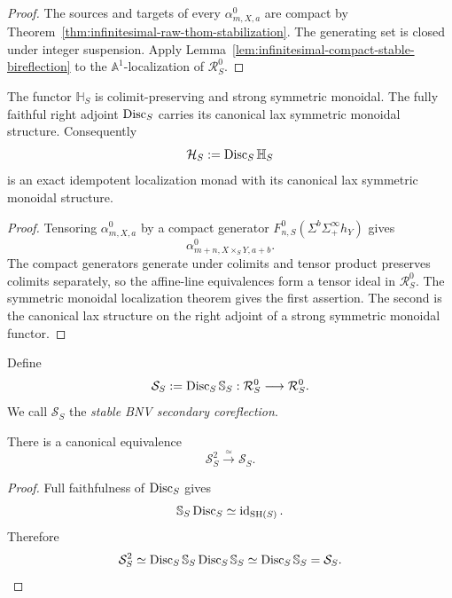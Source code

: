 \begin{proof}
The sources and targets of every \(\alpha^0_{m,X,a}\) are compact by
Theorem~\ref{thm:infinitesimal-raw-thom-stabilization}.  The generating set is
closed under integer suspension.  Apply
Lemma~\ref{lem:infinitesimal-compact-stable-bireflection} to the
\(\mathbb A^1\)-localization of \(\mathcal R_S^0\).
\end{proof}

\begin{proposition}
\label{prop:infinitesimal-bnv-monoidality}
The functor \(\mathbb H_S\) is colimit-preserving and strong symmetric
monoidal.  The fully faithful right adjoint \(\operatorname{Disc}_S\) carries its canonical
lax symmetric monoidal structure.  Consequently
\[
  \mathcal H_S:=\operatorname{Disc}_S\mathbb H_S
\]
is an exact idempotent localization monad with its canonical lax symmetric
monoidal structure.
\end{proposition}

\begin{proof}
Tensoring \(\alpha^0_{m,X,a}\) by a compact generator
\(F^0_{n,S}(\Sigma^b\Sigma^\infty_+h_Y)\) gives
\[
  \alpha^0_{m+n,X\times_SY,a+b}.
\]
The compact generators generate under colimits and tensor product preserves
colimits separately, so the affine-line equivalences form a tensor ideal in
\(\mathcal R_S^0\).  The symmetric monoidal localization theorem gives the
first assertion.  The second is the canonical lax structure on the right
adjoint of a strong symmetric monoidal functor.
\end{proof}

\begin{definition}
\label{def:infinitesimal-bnv-secondary-coreflection}
Define
\[
    \mathcal S_S
    :=
    \operatorname{Disc}_S\mathbb S_S:
    \mathcal R_S^0\longrightarrow\mathcal R_S^0.
\]
We call $\mathcal S_S$ the \emph{stable BNV secondary coreflection}.
\end{definition}

\begin{proposition}
\label{prop:infinitesimal-bnv-secondary-idempotent}
There is a canonical equivalence
\[
    \mathcal S_S^2\xrightarrow{\simeq}\mathcal S_S.
\]
\end{proposition}

\begin{proof}
Full faithfulness of $\operatorname{Disc}_S$ gives
\[
    \mathbb S_S\operatorname{Disc}_S\simeq\operatorname{id}_{\mathrm{SH}(S)}.
\]
Therefore
\[
    \mathcal S_S^2
    \simeq
    \operatorname{Disc}_S\mathbb S_S\operatorname{Disc}_S\mathbb S_S
    \simeq
    \operatorname{Disc}_S\mathbb S_S
    =
    \mathcal S_S.
\]
\end{proof}

